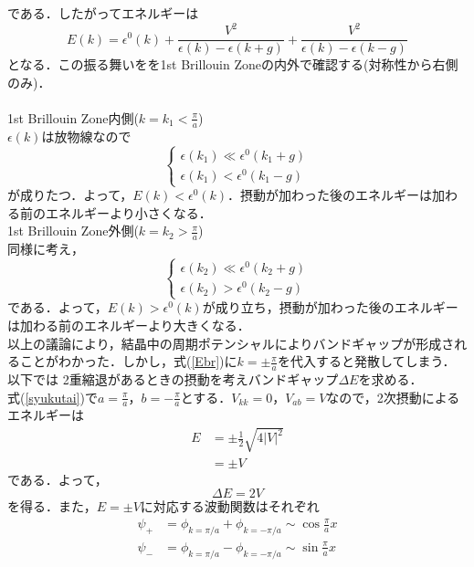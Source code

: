 \documentclass{report}
\begin{document}
  である．したがってエネルギーは
  \begin{equation}
    \label{Ebr}
    E(k)=\epsilon^0(k)+\frac{V^2}{\epsilon(k)-\epsilon(k+g)}+\frac{V^2}{\epsilon(k)-\epsilon(k-g)}
  \end{equation}
  となる．この振る舞いをを1st Brillouin Zoneの内外で確認する(対称性から右側のみ)．\\
  \\
  1st Brillouin Zone内側($k=k_1<\frac{\pi}{a}$)\\
  $\epsilon(k)$は放物線なので
  \begin{equation}
    \begin{cases}
      \epsilon(k_1)\ll\epsilon^0(k_1+g)\\
      \epsilon(k_1)<\epsilon^0(k_1-g)
    \end{cases}
  \end{equation}
  が成りたつ．よって，$E(k)<\epsilon^0(k)$．摂動が加わった後のエネルギーは加わる前のエネルギーより小さくなる．\\
  1st Brillouin Zone外側($k=k_2>\frac{\pi}{a}$)\\
  同様に考え，
  \begin{equation}
    \begin{cases}
      \epsilon(k_2)\ll\epsilon^0(k_2+g)\\
      \epsilon(k_2)>\epsilon^0(k_2-g)
    \end{cases}
  \end{equation}
  である．よって，$E(k)>\epsilon^0(k)$が成り立ち，摂動が加わった後のエネルギーは加わる前のエネルギーより大きくなる．\\
  以上の議論により，結晶中の周期ポテンシャルによりバンドギャップが形成されることがわかった．しかし，式(\ref{Ebr})に$k=\pm\frac{\pi}{a}$を代入すると発散してしまう．以下では
  2重縮退があるときの摂動を考えバンドギャップ$\Delta E$を求める．\\
  式(\ref{syukutai})で$a=\frac{\pi}{a}$，$b=-\frac{\pi}{a}$とする．$V_{kk}=0，V_{ab}=V$なので，2次摂動によるエネルギーは
  \begin{align}
    E&=\pm\frac{1}{2}\sqrt{4|V|^2}\\
    &=\pm V
  \end{align}
  である．よって，
  \begin{equation}
    \Delta E=2V
  \end{equation}
  を得る．また，$E=\pm V$に対応する波動関数はそれぞれ
  \begin{align}
    \psi_{+}&=\phi_{k=\pi/a}+\phi_{k=-\pi/a}\sim\cos\frac{\pi}{a}x\\
    \psi_{-}&=\phi_{k=\pi/a}-\phi_{k=-\pi/a}\sim\sin\frac{\pi}{a}x
  \end{align}
\end{document}
